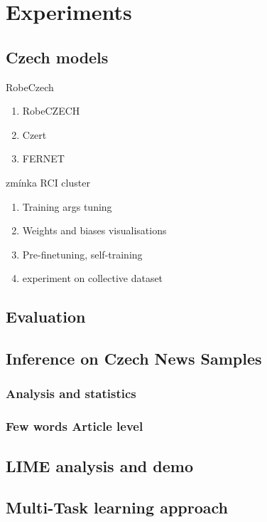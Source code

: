 \chapter{Experiments}

\section{Czech models}
RobeCzech
\begin{enumerate}
    \item RobeCZECH
    \item Czert
    \item FERNET
\end{enumerate}
zmínka RCI cluster
\begin{enumerate}
    \item Training args tuning
    \item Weights and biases visualisations
    \item Pre-finetuning, self-training
    \item experiment on collective dataset
\end{enumerate}

\section{Evaluation}
\section{Inference on Czech News Samples}
\subsection{Analysis and statistics}
\subsection{Few words Article level}

\section{LIME analysis and demo}

\section{Multi-Task learning approach}\label{mtl}